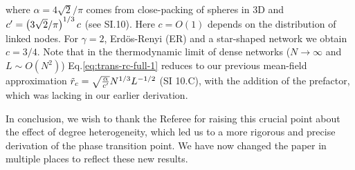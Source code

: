 \documentclass[11pt]{article}
\newcommand{\outNim}[1]{}
\begin{document}
\begin{response}
{\begin{align}
\end{align}
where $\alpha = 4\sqrt{2}/\pi $ comes from close-packing of spheres in 3D and $c' = \left({3\sqrt{2} / \pi}\right)^{1/3} c$ (see SI.10). 
Here $c = O(1)$ depends on the distribution of linked nodes. 
For $\gamma = 2$, Erd\"os-Renyi (ER) and a star-shaped network we obtain $c = 3/4$. 
Note that in the thermodynamic limit of dense networks ($N\to \infty$ and $L\sim O(N^2)$) Eq.\eqref{eq:trans-rc-full-1} reduces to our previous mean-field approximation $\tilde{r}_c = \sqrt{{\alpha \over c'}} N^{1/3}L^{-1/2}$ ({SI 10.C}), with the addition of the prefactor, which was lacking in our earlier derivation.
}%
\outNim{
Most importantly, \eqref{eq:trans-rc-full-1} can be  used to estimate finite-size effects due to degree heterogeneity by finding the standard deviation of $\tilde{r}_c(k)$ over the degree distribution. 
By doing so, we are now able to predict the finite region in the phase space where the phase transition takes place. 
We have updated the phase diagram to reflect this new result (Fig. 2). 
}%


In conclusion, we wish to thank the Referee for raising this crucial point about the effect of degree heterogeneity, which led us to a more rigorous and precise derivation of the phase transition point. %
We have now changed the paper in multiple places to reflect these new results. 

\end{response}
\end{document}
